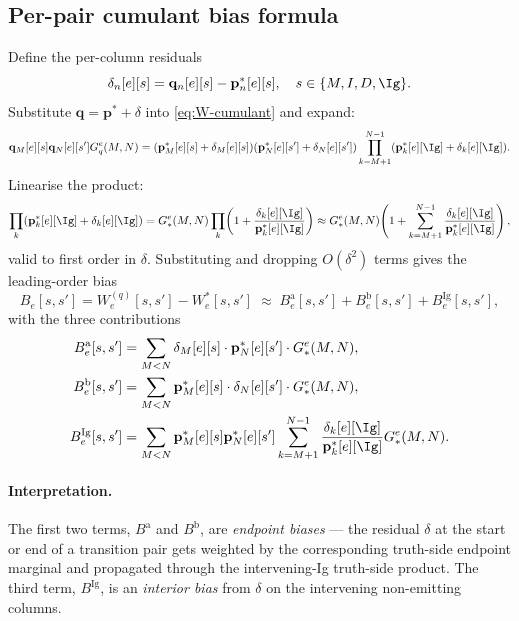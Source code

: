 \subsection{Per-pair cumulant bias formula}
\label{app:varanc-bias-formula}

Define the per-column residuals
\begin{equation}
\delta_n[e][s] = \mathbf{q}_n[e][s] - \mathbf{p}^*_n[e][s],
\quad
s \in \{M, I, D, \Ig\}.
\end{equation}
Substitute $\mathbf{q} = \mathbf{p}^* + \delta$ into
\eqref{eq:W-cumulant} and expand:
\begin{equation}
\mathbf{q}_M[e][s] \mathbf{q}_N[e][s'] G_q^e(M, N)
= (\mathbf{p}^*_M[e][s] + \delta_M[e][s])
   (\mathbf{p}^*_N[e][s'] + \delta_N[e][s'])
   \prod_{k=M+1}^{N-1} (\mathbf{p}^*_k[e][\Ig] + \delta_k[e][\Ig]).
\end{equation}
Linearise the product:
\begin{equation}
\prod_k (\mathbf{p}^*_k[e][\Ig] + \delta_k[e][\Ig])
= G_*^e(M, N) \prod_k \!\left(1 + \frac{\delta_k[e][\Ig]}
                                       {\mathbf{p}^*_k[e][\Ig]}\right)
\approx G_*^e(M, N) \!\left(1 + \sum_{k=M+1}^{N-1}
                              \frac{\delta_k[e][\Ig]}
                                   {\mathbf{p}^*_k[e][\Ig]}\right),
\end{equation}
valid to first order in $\delta$.  Substituting and dropping
$O(\delta^2)$ terms gives the leading-order bias
\begin{equation}
\label{eq:bias-leading}
\boxed{
B_e[s, s'] = W_e^{(q)}[s, s'] - W_e^{*}[s, s']
\;\approx\;
B_e^{\text{a}}[s, s'] + B_e^{\text{b}}[s, s'] +
B_e^{\text{Ig}}[s, s'],
}
\end{equation}
with the three contributions
\begin{align}
B_e^{\text{a}}[s, s'] &=
\sum_{M < N} \delta_M[e][s] \cdot \mathbf{p}^*_N[e][s'] \cdot G_*^e(M, N),
\\
B_e^{\text{b}}[s, s'] &=
\sum_{M < N} \mathbf{p}^*_M[e][s] \cdot \delta_N[e][s'] \cdot G_*^e(M, N),
\\
B_e^{\text{Ig}}[s, s'] &=
\sum_{M < N} \mathbf{p}^*_M[e][s] \mathbf{p}^*_N[e][s']
\sum_{k=M+1}^{N-1}
\frac{\delta_k[e][\Ig]}{\mathbf{p}^*_k[e][\Ig]} G_*^e(M, N).
\end{align}

\paragraph{Interpretation.}
The first two terms, $B^{\text{a}}$ and $B^{\text{b}}$, are
\emph{endpoint biases} — the residual $\delta$ at the start or
end of a transition pair gets weighted by the corresponding
truth-side endpoint marginal and propagated through the
intervening-Ig truth-side product.  The third term,
$B^{\text{Ig}}$, is an \emph{interior bias} from $\delta$ on the
intervening non-emitting columns.

